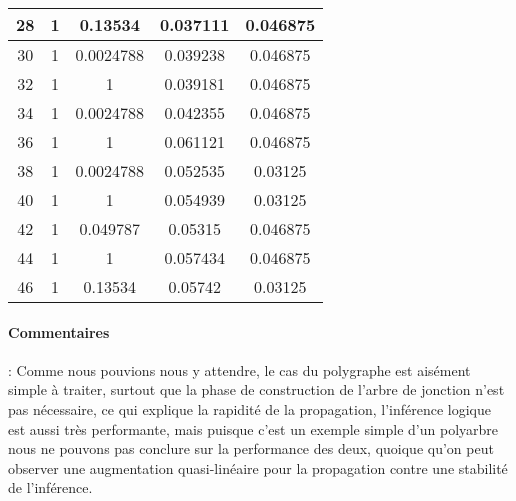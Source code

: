 \documentclass[]{report}
\begin{document}
\begin{table}[H]
{\begin{tabular}{|c|c|c|c|c|}
    28                    & 1                      & 0.13534                       & 0.037111                      & 0.046875                   \\ \hline
    30                    & 1                      & 0.0024788                     & 0.039238                      & 0.046875                   \\ \hline
    32                    & 1                      & 1                             & 0.039181                      & 0.046875                   \\ \hline
    34                    & 1                      & 0.0024788                     & 0.042355                      & 0.046875                   \\ \hline
    36                    & 1                      & 1                             & 0.061121                      & 0.046875                   \\ \hline
    38                    & 1                      & 0.0024788                     & 0.052535                      & 0.03125                    \\ \hline
    40                    & 1                      & 1                             & 0.054939                      & 0.03125                    \\ \hline
    42                    & 1                      & 0.049787                      & 0.05315                       & 0.046875                   \\ \hline
    44                    & 1                      & 1                             & 0.057434                      & 0.046875                   \\ \hline
    46                    & 1                      & 0.13534                       & 0.05742                       & 0.03125                    \\ \hline
    \end{tabular}%
    }
    \end{table}
    \paragraph{Commentaires}:
    Comme nous pouvions nous y attendre, le cas du polygraphe est aisément simple à traiter, surtout que la phase de construction de l'arbre de jonction n'est pas nécessaire, ce qui explique la rapidité de la propagation, l'inférence logique est aussi très performante, mais puisque c'est un exemple simple d'un polyarbre nous ne pouvons pas conclure sur la performance des deux, quoique qu'on peut observer une augmentation quasi-linéaire pour la propagation contre une stabilité de l'inférence.
	
\end{document}
